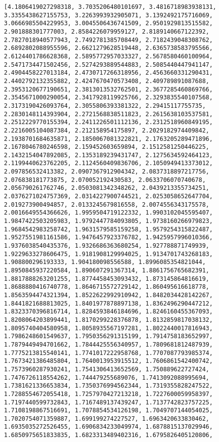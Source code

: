 \documentclass[11pt]{article}
\begin{document}
    \begin{Verbatim}[commandchars=\\\{\}]
[4.1806419027298318, 3.7035206480101697, 3.4816718983938131, 3.3355438627155753, 3.2263993932905071, 3.1392492175716069, 3.0666985504229953, 3.0045506436741509, 2.9501929813515582, 2.901888301777003, 2.8584226079959127, 2.8189140667122392, 2.7827018940577943, 2.7492781385708449, 2.7182439048308762, 2.6892802088955596, 2.6621279628519448, 2.6365738583795566, 2.6124401786628368, 2.5895772957033327, 2.5678580460100964, 2.5471734471502456, 2.5274293889544883, 2.5085440447941147, 2.4904458227013184, 2.4730717266318956, 2.4563660331290431, 2.4402792132355882, 2.4247670470573408, 2.409789891087688, 2.3953120677190651, 2.3813013532762501, 2.3677285460869766, 2.3545671000290054, 2.3417928119925766, 2.3293835540107568, 2.3173190426093764, 2.3055806393381322, 2.29415117755735, 2.2830148114393904, 2.2721568838511823, 2.2615638103537581, 2.2512229770155394, 2.2411226501112136, 2.2312518960849195, 2.2216005104087384, 2.212158954175897, 2.2029182974409842, 2.1938701684635871, 2.1850067081322821, 2.1763205289471896, 2.1678046780246598, 2.159452603659894, 2.1512581250446225, 2.1432154047892085, 2.1353189239431747, 2.1275634592464123, 2.1199440623762205, 2.1124560409836706, 2.1050949413373012, 2.097856532413382, 2.0907367912904342, 2.0837318897217756, 2.076838181773875, 2.070052192430583, 2.0633706070740678, 2.056790261762746, 2.0503081342348262, 2.0439213355734251, 2.0376271024757369, 2.0314227900744521, 2.0253058652647704, 2.019273900494857, 2.0133245679816558, 2.0074556343175578, 2.0016649554366626, 1.9959504719122332, 1.9903102045595407, 1.9847422503205983, 1.9792447784093805, 1.9738160266979823, 1.9684542983258742, 1.9631579585159258, 1.9579254315822487, 1.9527551981161586, 1.9476457923376782, 1.9425957996010366, 1.9376038540435376, 1.9326686363680254, 1.927788871749939, 1.9229633278606475, 1.9181908129994025, 1.9134701743268183, 1.908800296193333, 1.904180098556588, 1.8996085354821044, 1.8950845937220584, 1.890607291367314, 1.8861756765682391, 1.8817888263201255, 1.8774458453093432, 1.873145864816619, 1.8688880416740778, 1.8646715572729142, 1.860495616618778, 1.8563594474321394, 1.8522622992910942, 1.8482034428142267, 1.8441821688813025, 1.8401977878897138, 1.8362496290447212, 1.8323370396816714, 1.8284593846184696, 1.8246160455367093, 1.8208064203899441, 1.8170299228376878, 1.8132859817038132, 1.8095740404580958, 1.8058935567197281, 1.8022440017816943, 1.7986248601549637, 1.7950356291315199, 1.7914758183652997, 1.7879449494701662, 1.7844425556340957, 1.7809681812487939, 1.7775213815540141, 1.7741017222958768, 1.7707087793985374, 1.7673421386485804, 1.7640013953915512, 1.7606861542400742, 1.7573960287930241, 1.7541306413652569, 1.750889622727424, 1.7476726118554262, 1.744479255689076, 1.7413092088995694, 1.7381621336653834, 1.7350376994562344, 1.7319355828247522, 1.7288554672055418, 1.7257970427213218, 1.7227600059958397, 1.7197440599732843, 1.7167489137439247, 1.7137742823757225, 1.7108198867516691, 1.7078854534126198, 1.7049707144054025, 1.7020754071359887, 1.699199274227527, 1.6963420633830462, 1.6935035272526455, 1.6906834233049974, 1.6878815137029946, 1.6850975651833835, 1.6823313489402316, 1.6795826405120806, 
\end{Verbatim}
\end{document}
